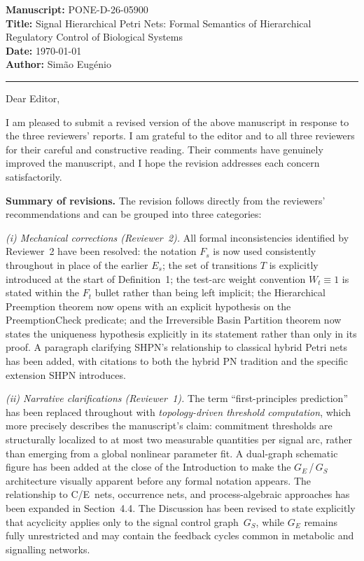 \documentclass[11pt,letterpaper]{article}
\begin{document}
\textbf{Manuscript:} PONE-D-26-05900\\
\textbf{Title:} Signal Hierarchical Petri Nets: Formal Semantics of
Hierarchical Regulatory Control of Biological Systems\\
\textbf{Date:} \today\\
\textbf{Author:} Sim\~{a}o Eug\'{e}nio

\bigskip
\hrule
\bigskip

Dear Editor,

I am pleased to submit a revised version of the above manuscript in response
to the three reviewers' reports. I am grateful to the editor and to all three
reviewers for their careful and constructive reading. Their comments have
genuinely improved the manuscript, and I hope the revision addresses each
concern satisfactorily.

\medskip
\textbf{Summary of revisions.}
The revision follows directly from the reviewers' recommendations and can be
grouped into three categories:

\textit{(i) Mechanical corrections (Reviewer~2).}
All formal inconsistencies identified by Reviewer~2 have been resolved:
the notation $F_s$ is now used consistently throughout in place of the earlier
$E_s$; the set of transitions $T$ is explicitly introduced at the start of
Definition~1; the test-arc weight convention $W_t \equiv 1$ is stated within
the $F_t$ bullet rather than being left implicit; the Hierarchical Preemption
theorem now opens with an explicit hypothesis on the PreemptionCheck
predicate; and the Irreversible Basin Partition theorem now states the
uniqueness hypothesis explicitly in its statement rather than only in its proof.
A paragraph clarifying SHPN's relationship to classical hybrid Petri nets has
been added, with citations to both the hybrid PN tradition and the specific
extension SHPN introduces.

\textit{(ii) Narrative clarifications (Reviewer~1).}
The term ``first-principles prediction'' has been replaced throughout with
\textit{topology-driven threshold computation}, which more precisely describes
the manuscript's claim: commitment thresholds are structurally localized to at
most two measurable quantities per signal arc, rather than emerging from a
global nonlinear parameter fit. A dual-graph schematic figure has been added
at the close of the Introduction to make the $G_E$\,/\,$G_S$ architecture
visually apparent before any formal notation appears. The relationship to
C/E~nets, occurrence nets, and process-algebraic approaches has been expanded
in Section~4.4. The Discussion has been revised to state explicitly that
acyclicity applies only to the signal control graph~$G_S$, while $G_E$ remains
fully unrestricted and may contain the feedback cycles common in metabolic and
signalling networks.
\end{document}
